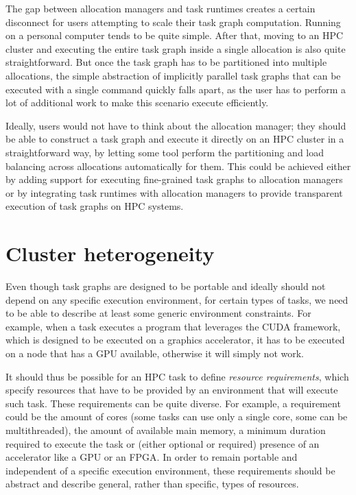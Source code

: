 \vspace{5mm}
The gap between allocation managers and task runtimes creates a certain disconnect for users
attempting to scale their task graph computation. Running on a personal computer tends to be quite
simple. After that, moving to an HPC cluster and executing the entire task graph inside a single
allocation is also quite straightforward. But once the task graph has to be partitioned into
multiple allocations, the simple abstraction of implicitly parallel task graphs that can be
executed with a single command quickly falls apart, as the user has to perform a lot of additional
work to make this scenario execute efficiently.

Ideally, users would not have to think about the allocation manager; they should be able to
construct a task graph and execute it directly on an HPC cluster in a straightforward way, by
letting some tool perform the partitioning and load balancing across allocations automatically for
them. This could be achieved either by adding support for executing fine-grained task graphs to
allocation managers or by integrating task runtimes with allocation managers to provide transparent
execution of task graphs on HPC systems.


\section{Cluster heterogeneity}
Even though task graphs are designed to be portable and ideally should not depend on any specific
execution environment, for certain types of tasks, we need to be able to describe at least some
generic environment constraints. For example, when a task executes a program that leverages the
CUDA framework, which is designed to be executed on a graphics
accelerator, it has to be executed on a node that has a GPU available, otherwise it will simply not
work.

It should thus be possible for an HPC task to define \emph{resource requirements}, which specify
resources that have to be provided by an environment that will execute such task. These
requirements can be quite diverse. For example, a requirement could be the amount of cores (some
tasks can use only a single core, some can be multithreaded), the amount of available main memory,
a minimum duration required to execute the task or (either optional or required) presence of an
accelerator like a GPU or an FPGA\@. In order to remain portable and independent of a specific
execution environment, these requirements should be abstract and describe general, rather than
specific, types of resources.

